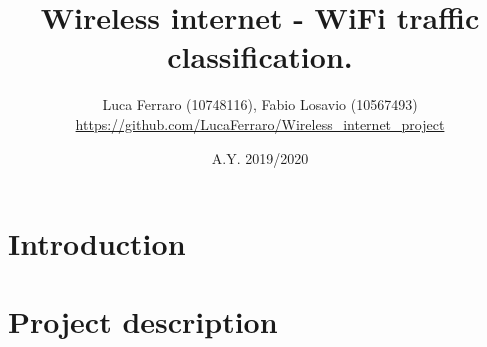 \documentclass{article} %
\title{\textbf{\huge{Wireless internet - WiFi traffic classification.}}}
\author{Luca Ferraro (10748116), Fabio Losavio (10567493) \\ 
\textcolor{url_blue}{\url{https://github.com/LucaFerraro/Wireless_internet_project}}}
\date{A.Y. 2019/2020}
\begin{document}

\begin{titlingpage}
    \maketitle
\end{titlingpage}

\newpage{}

\tableofcontents
\listoffigures
\lstlistoflistings
\newpage{}

\clearpage
\section{Introduction}
\label{sect:introduction}



\clearpage
\section{Project description}
\label{sect:project}

\end{document}
